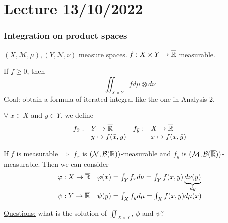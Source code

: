 \section{Lecture 13/10/2022}
\subsubsection*{Integration on product spaces}
\((X, \mathcal{M}, \mu), (Y, \mathcal{N},\nu)\) measure spaces. \(f : X \times Y \to \overline{\mathbb{R}}\) measurable.

If \(f \geq 0\), then 
\[
    \iint_{X \times Y} f d\mu\otimes d\nu
\]
Goal: obtain a formula of iterated integral like the one in Analysis 2.

\(\forall \; \bar{x} \in X\) and \(\bar{y} \in Y\), we define
\[
    \begin{array}{llll}
        f_{\bar{x}} :& Y \to \overline{\mathbb{R}} & f_{\bar{y}}:& X \to \overline{\mathbb{R}}  \\
        & y \mapsto f(\bar{x}, y) & & x \mapsto f(x, \bar{y})

    \end{array}
\]
\begin{proposition}
    If \(f\) is measurable \(\Rightarrow\) \(f_{\bar{x}}\) is \((\mathcal{N}, \mathcal{B}(\mathbb{R}))\)-measurable and \(f_{\bar{y}}\) is \((\mathcal{M}, \mathcal{B}(\overline{\mathbb{R}}))\)-measurable.
    Then we can consider
    \[
        \begin{array}{ll}    
        \varphi : X \to \overline{\mathbb{R}} & 
        \varphi(x) = \int_Y f_x d\nu = \int_Y f(x,y) \underbrace{d\nu(y)}_{dy} \\
        \psi : Y \to \overline{\mathbb{R}} &
        \psi(y) = \int_X f_y d\mu = \int_X f(x,y) d\mu(x)
    \end{array}
    \]
\end{proposition}
\noindent\underline{Questions:} what is the solution of \(\iint_{X \times Y}\), \(\phi\) and \(\psi\)?

